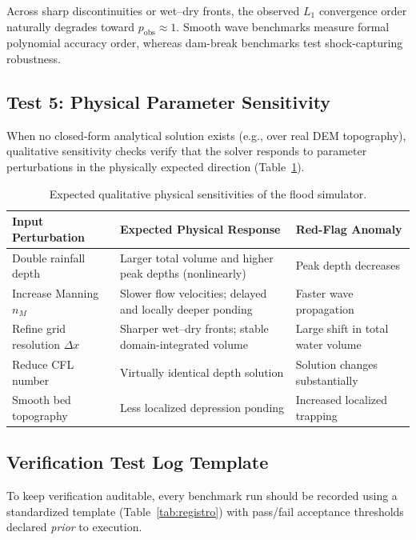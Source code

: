 \documentclass[11pt,a4paper]{article}
\begin{document}
\begin{cuidado}
Across sharp discontinuities or wet--dry fronts, the observed $L_1$ convergence order naturally degrades toward $p_{\text{obs}} \approx 1$. Smooth wave benchmarks measure formal polynomial accuracy order, whereas dam-break benchmarks test shock-capturing robustness.
\end{cuidado}

\subsection{Test 5: Physical Parameter Sensitivity}

When no closed-form analytical solution exists (e.g., over real DEM topography), qualitative sensitivity checks verify that the solver responds to parameter perturbations in the physically expected direction (Table~\ref{tab:sensibilidad}).

\begin{table}[htbp]
\centering
\caption{Expected qualitative physical sensitivities of the flood simulator.}
\label{tab:sensibilidad}
\small
\begin{tabularx}{\linewidth}{@{}lXX@{}}
\toprule
Input Perturbation & Expected Physical Response & Red-Flag Anomaly \\
\midrule
Double rainfall depth & Larger total volume and higher peak depths (nonlinearly) & Peak depth decreases \\
Increase Manning $n_M$ & Slower flow velocities; delayed and locally deeper ponding & Faster wave propagation \\
Refine grid resolution $\Delta x$ & Sharper wet--dry fronts; stable domain-integrated volume & Large shift in total water volume \\
Reduce CFL number & Virtually identical depth solution & Solution changes substantially \\
Smooth bed topography & Less localized depression ponding & Increased localized trapping \\
\bottomrule
\end{tabularx}
\end{table}

\subsection{Verification Test Log Template}

To keep verification auditable, every benchmark run should be recorded using a standardized template (Table~\ref{tab:registro}) with pass/fail acceptance thresholds declared \emph{prior} to execution.
\end{document}
